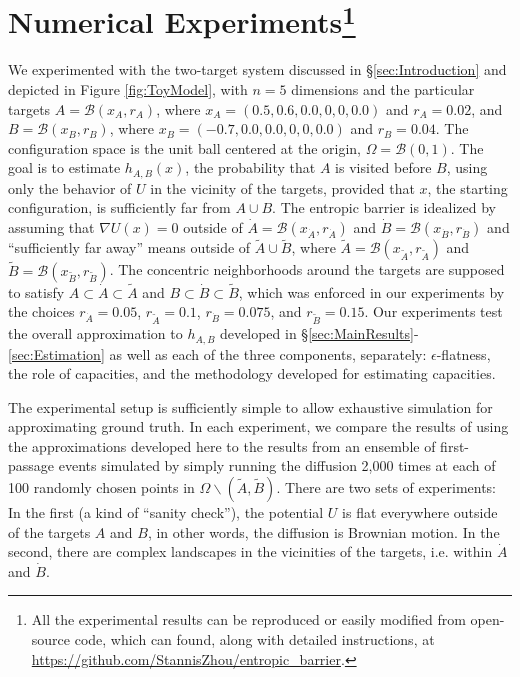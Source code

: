 \documentclass[nofootinbib,english, aip, jcp, priprint, graphicx,floatfix]{revtex4-1}
\theoremstyle{plain}
\theoremstyle{definition}
\theoremstyle{plain}
\newcommand{\bb}[1]{\mathcal{B}\left(#1\right)}
\newcommand{\dA}{{\dot A}}
\newcommand{\tA}{{\tilde A}}
\newcommand{\dB}{{\dot B}}
\newcommand{\tB}{{\tilde B}}
\begin{document}
 \section{Numerical Experiments\footnote{All the experimental results can be reproduced or easily modified from open-source code, which can found, along with detailed instructions, at \url{https://github.com/StannisZhou/entropic_barrier}.}}
\label{sec:Experiments}
We experimented with the two-target system discussed in \S\ref{sec:Introduction} and depicted in Figure \ref{fig:ToyModel}, with $n=5$ dimensions 
and the particular targets $A=\bb{x_A, r_A}$,  where $x_A=(0.5,0.6,0.0,0,0,0.0)$ and $r_A=0.02$, and 
$B=\bb{x_B, r_B}$,  where $x_B=(-0.7,0.0,0.0,0,0,0.0)$ and $r_B=0.04$. The configuration space is the unit ball centered at 
the origin, $\Omega=\bb{0,1}$. 
The goal is to estimate $h_{A,B}(x)$, the probability that $A$ is visited before $B$, using only the behavior of $U$ in the vicinity of the targets, provided that $x$, the starting configuration, is sufficiently far from $A\cup B$. The entropic barrier is idealized by assuming that $\nabla U(x)=0$ outside of $\dA=\bb{x_\dA, r_\dA}$ and $\dB=\bb{x_\dB, r_\dB}$ and ``sufficiently far away'' means outside of $\tA \cup \tB$, where $\tA=\bb{x_\tA, r_\tA}$ and $\tB=\bb{x_\tB, r_\tB}$. The concentric neighborhoods around the targets are supposed to satisfy $A\subset\dA\subset\tA$ and 
$B\subset\dB\subset\tB$, which was enforced in our experiments by the choices $r_\dA= 0.05$, $r_\tA=0.1$, $r_\dB=0.075$, and
$r_\tB=0.15$.
Our experiments test the overall approximation to $h_{A,B}$ developed in \S\ref{sec:MainResults}-\ref{sec:Estimation} as well as each of the three components, separately: $\epsilon$-flatness, the role of capacities, and the methodology developed for estimating capacities.

The experimental setup is sufficiently simple to allow
exhaustive simulation for approximating ground truth. In each experiment, we compare the results of using the approximations developed here to the results from an ensemble of first-passage events simulated by simply running the diffusion 2,000 times at each of 100 randomly chosen points in $\Omega\backslash (\tA,\tB)$. There are two sets of experiments: In the first (a kind of ``sanity check''), the potential $U$ is flat everywhere outside of the targets $A$ and $B$, in other words, the diffusion is Brownian motion. In the second, there are complex landscapes in the vicinities of the targets, i.e. within $\dA$ and $\dB$.
\end{document}
